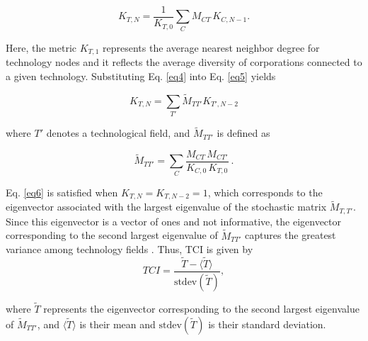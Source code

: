 \documentclass[fleqn,10pt]{wlscirep}
\begin{document}
\begin{equation} \label{eq5}
K_{T,N} = \frac{1}{K_{T,0}} \sum_{C} M_{CT}\, K_{C,N-1}.
\end{equation}

Here, the metric \(K_{T,1}\) represents the average nearest neighbor degree for technology nodes and it reflects the average diversity of corporations connected to a given technology.
Substituting Eq. \ref{eq4} into Eq. \ref{eq5} yields

\begin{equation} \label{eq6}
K_{T,N} = \sum_{T'} \widetilde{M}_{TT'} K_{T',N-2}
\end{equation}

where \(T'\) denotes a technological field, and $\widetilde{M}_{TT'}$ is defined as

\begin{equation} \label{eq7}
\widetilde{M}_{TT'} = \sum_{C} \frac{M_{CT}\, M_{CT'}}{K_{C,0}\, K_{T,0}}~.
\end{equation}

Eq. \ref{eq6} is satisfied when  \(K_{T,N} = K_{T,N-2} = 1\), which corresponds to the eigenvector associated with the largest eigenvalue of the stochastic matrix \(\widetilde{M}_{T,T'}\). 
Since this eigenvector is a vector of ones and not informative, the eigenvector corresponding to the second largest eigenvalue of \(\widetilde{M}_{TT'}\) captures the greatest variance among technology fields \cite{Hidalgo2021, Mealy2019}.
Thus, TCI is given by
\begin{equation} \label{eq8}
TCI = \frac{\widetilde{T} - \langle \widetilde{T} \rangle}{\text{stdev}(\widetilde{T})},
\end{equation}

where \(\widetilde{T}\) represents the eigenvector corresponding to the second largest eigenvalue of \(\widetilde{M}_{TT'}\), and \(\langle \widetilde{T} \rangle\) is their mean and \(\text{stdev}(\widetilde{T})\) is their standard deviation.






\end{document}
